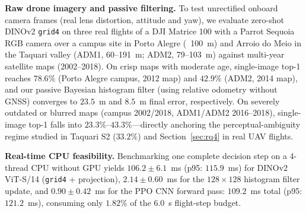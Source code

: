 \begin{table}[t]
\centering
\caption{Real post-flood UAV orthomosaic (Canoas / Mathias Velho, CBPMESP May 25--26, 2024) vs.\ pre-flood Maxar map (Feb.\ 2024): 1{,}000 paired episodes across 64 $1.0\times 1.0$~km windows, hierarchical 95\% CIs (seeds $\rightarrow$ windows).}
\label{tab:uav}
\footnotesize
\setlength{\tabcolsep}{2.5pt}
\resizebox{\columnwidth}{!}{}
\end{table}

\textbf{Raw drone imagery and passive filtering.}
To test unrectified onboard camera frames (real lens distortion, attitude and yaw), we evaluate zero-shot DINOv2 \texttt{grid4} on three real flights of a DJI Matrice 100 with a Parrot Sequoia RGB camera over a campus site in Porto Alegre (~100~m) and Arroio do Meio in the Taquari valley (ADM1, 60--191~m; ADM2, 79--103~m) against multi-year satellite maps (2002--2018). On crisp maps with moderate age, single-image top-1 reaches $78.6\%$ (Porto Alegre campus, 2012 map) and $42.9\%$ (ADM2, 2014 map), and our passive Bayesian histogram filter (using relative odometry without GNSS) converges to $23.5$~m and $8.5$~m final error, respectively. On severely outdated or blurred maps (campus 2002/2018, ADM1/ADM2 2016--2018), single-image top-1 falls into $23.3\%$--$43.3\%$—directly anchoring the perceptual-ambiguity regime studied in Taquari S2 ($33.2\%$) and Section~\ref{sec:rq4} in real UAV flights.

\textbf{Real-time CPU feasibility.}
Benchmarking one complete decision step on a 4-thread CPU without GPU yields $106.2\pm 6.1$~ms (p95: $115.9$~ms) for DINOv2 ViT-S/14 (\texttt{grid4} + projection), $2.14\pm 0.60$~ms for the $128\times 128$ histogram filter update, and $0.90\pm 0.42$~ms for the PPO CNN forward pass: $109.2$~ms total (p95: $121.2$~ms), consuming only $1.82\%$ of the 6.0~s flight-step budget.
